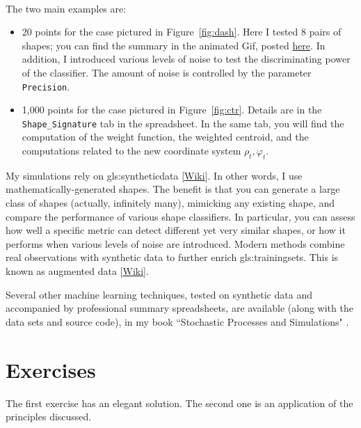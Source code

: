 \documentclass[oneside,10pt]{book}
\begin{document}
\vspace{1ex}\\
The two main examples are:
\begin{itemize}
\item 20 points for the case pictured in Figure~\ref{fig:dash}. Here I tested 8 pairs of shapes; you can find the summary in the animated Gif, posted 
\href{https://mltechniques.com/2022/04/20/computer-vision-shape-classification-via-explainable-ai/}{here}. In addition, I introduced various levels of noise to test the discriminating power of the classifier. The amount of noise is controlled by the parameter \texttt{Precision}.
\item 1,000 points for the case pictured in Figure~\ref{fig:ctr}. Details are in the \texttt{Shape\_Signature} tab in the spreadsheet. In the same tab, you will find the computation of the weight function, the weighted centroid, and the computations related to the new coordinate system $\rho_t,\varphi_t$.
\end{itemize}
My simulations rely on \gls{gls:syntheticdata} [\href{https://en.wikipedia.org/wiki/Synthetic_data}{Wiki}]. In other words, I use mathematically-generated shapes. The benefit is that you can generate a large class of shapes (actually, infinitely many), mimicking any existing shape, and compare the performance of various shape classifiers. 
In particular, you can assess how well a specific metric can detect different yet very similar shapes, or how it performs when various levels of noise are introduced. Modern methods combine real observations with synthetic data to further enrich \glspl{gls:trainingset}. This is known as \textcolor{index}{augmented data} [\href{https://en.wikipedia.org/wiki/Data_augmentation}{Wiki}].

Several other machine learning techniques, tested on synthetic data and accompanied by professional summary spreadsheets, are available (along with the data sets and source code), in my book ``Stochastic Processes and Simulations" \cite{vgsimulnew}. 

\section{Exercises}

The first exercise has an elegant solution. The second one is an application of the principles discussed. 
\end{document}
